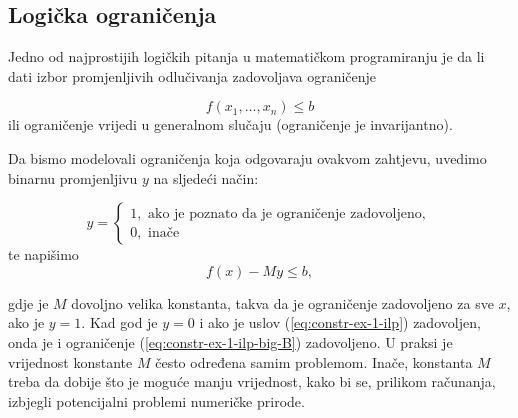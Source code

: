 \documentclass[a4paper, utf8, 11pt, colorlinks]{book}
\theoremstyle{definition}
\begin{document}

\subsection{Logička ograničenja}
Jedno od najprostijih logičkih pitanja u matematičkom programiranju je da li dati izbor promjenljivih odlučivanja zadovoljava ograničenje

\begin{equation}\label{eq:constr-ex-1-ilp}
   f(x_1,\ldots, x_n )\leq b
\end{equation}
 ili   ograničenje vrijedi u generalnom slučaju (ograničenje je invarijantno). 
 
 Da bismo modelovali ograničenja koja odgovaraju ovakvom zahtjevu, uvedimo binarnu promjenljivu $y$ na sljedeći način:
 
$$y =\begin{cases}
1, \mbox{ ako je poznato da je ograničenje zadovoljeno}, \\
0, \mbox{ inače}
\end{cases}$$
te napišimo 
\begin{equation}\label{eq:constr-ex-1-ilp-big-B}
   f(x) - M y \leq b,
\end{equation}

gdje je $M$ dovoljno velika konstanta, takva da je 
ograničenje zadovoljeno za sve $x$, ako je $y =1$. Kad god je $y=0$ i ako je uslov (\ref{eq:constr-ex-1-ilp}) zadovoljen, onda je i ograničenje (\ref{eq:constr-ex-1-ilp-big-B}) zadovoljeno. U praksi je vrijednost  konstante $M$ često određena samim problemom. Inače, konstanta $M$ treba da dobije što je moguće manju vrijednost, kako bi se, prilikom računanja, izbjegli potencijalni problemi numeričke prirode. 
\end{document}
